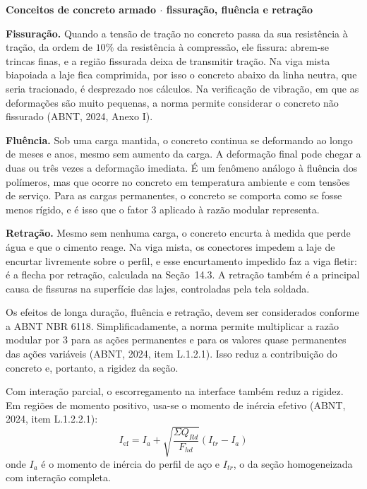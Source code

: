 \documentclass[11pt,a4paper]{article}
\newcommand{\caixaconceito}[2]{%
  \par\vspace{6pt}\noindent\colorbox{calloutbg}{%
    \parbox{\dimexpr\linewidth-2\fboxsep\relax}{%
      \vspace{4pt}\textbf{\color{primary}#1}\par\vspace{3pt}#2\vspace{4pt}%
    }%
  }\par\vspace{6pt}%
}
\begin{document}
\caixaconceito{Conceitos de concreto armado $\cdot$ fissuração, fluência e retração}{%
\textbf{Fissuração.} Quando a tensão de tração no concreto passa da sua resistência à tração, da ordem de $10\%$ da resistência à compressão, ele fissura: abrem-se trincas finas, e a região fissurada deixa de transmitir tração. Na viga mista biapoiada a laje fica comprimida, por isso o concreto abaixo da linha neutra, que seria tracionado, é desprezado nos cálculos. Na verificação de vibração, em que as deformações são muito pequenas, a norma permite considerar o concreto não fissurado (ABNT, 2024, Anexo I).\par\vspace{4pt}
\textbf{Fluência.} Sob uma carga mantida, o concreto continua se deformando ao longo de meses e anos, mesmo sem aumento da carga. A deformação final pode chegar a duas ou três vezes a deformação imediata. É um fenômeno análogo à fluência dos polímeros, mas que ocorre no concreto em temperatura ambiente e com tensões de serviço. Para as cargas permanentes, o concreto se comporta como se fosse menos rígido, e é isso que o fator $3$ aplicado à razão modular representa.\par\vspace{4pt}
\textbf{Retração.} Mesmo sem nenhuma carga, o concreto encurta à medida que perde água e que o cimento reage. Na viga mista, os conectores impedem a laje de encurtar livremente sobre o perfil, e esse encurtamento impedido faz a viga fletir: é a flecha por retração, calculada na Seção~14.3. A retração também é a principal causa de fissuras na superfície das lajes, controladas pela tela soldada.}

Os efeitos de longa duração, fluência e retração, devem ser considerados conforme a ABNT NBR 6118. Simplificadamente, a norma permite multiplicar a razão modular por $3$ para as ações permanentes e para os valores quase permanentes das ações variáveis (ABNT, 2024, item L.1.2.1). Isso reduz a contribuição do concreto e, portanto, a rigidez da seção.

Com interação parcial, o escorregamento na interface também reduz a rigidez. Em regiões de momento positivo, usa-se o momento de inércia efetivo (ABNT, 2024, item L.1.2.2.1):
\begin{equation}
  I_{\text{ef}} = I_a + \sqrt{\frac{\Sigma Q_{Rd}}{F_{hd}}}\left(I_{tr} - I_a\right)
  \label{eq:ief}
\end{equation}
onde $I_a$ é o momento de inércia do perfil de aço e $I_{tr}$, o da seção homogeneizada com interação completa.
\end{document}
